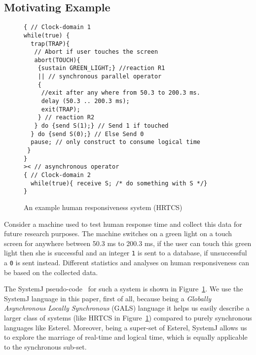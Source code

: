 \subsection{Motivating Example}
\label{sec:motivating-example}

\begin{figure}[t!]
	\vspace{-10pt}
		\begin{lstlisting}[style=sysj,morekeywords={sustain,send,receive,abort,await,emit,present,trap,pause,exit,delay,suspend}]
{ // Clock-domain 1
while(true) {
  trap(TRAP){
   // Abort if user touches the screen
   abort(TOUCH){
    {sustain GREEN_LIGHT;} //reaction R1
    || // synchronous parallel operator
    {
     //exit after any where from 50.3 to 200.3 ms.
     delay (50.3 .. 200.3 ms); 
     exit(TRAP); 
    } // reaction R2
   } do {send S(1);} // Send 1 if touched 
  } do {send S(0);} // Else Send 0
  pause; // only construct to consume logical time
 }
}
>< // asynchronous operator
{ // Clock-domain 2
  while(true){ receive S; /* do something with S */}
}
\end{lstlisting}
\caption{An example human responsiveness system (HRTCS)}
\label{fig:1}
\end{figure}

Consider a machine used to test human response time and collect this
data for future research purposes. The machine switches on a green light
on a touch screen for anywhere between 50.3 ms to 200.3 ms, if the user
can touch this green light then she is successful and an integer
\texttt{1} is sent to a database, if unsuccessful a \texttt{0} is sent
instead. Different statistics and analyses on human responsiveness can
be based on the collected data.

The SystemJ pseudo-code~\cite{amal10} for such a system is shown in
Figure~\ref{fig:1}. We use the SystemJ language in this paper, first of
all, because being a \textit{Globally Asynchronous Locally Synchronous}
(GALS) language it helps us easily describe a larger class of systems
(like HRTCS in Figure~\ref{fig:1}) compared to purely synchronous
languages like Esterel. Moreover, being a super-set of Esterel, SystemJ
allows us to explore the marriage of real-time and logical time, which
is equally applicable to the synchronous sub-set.

